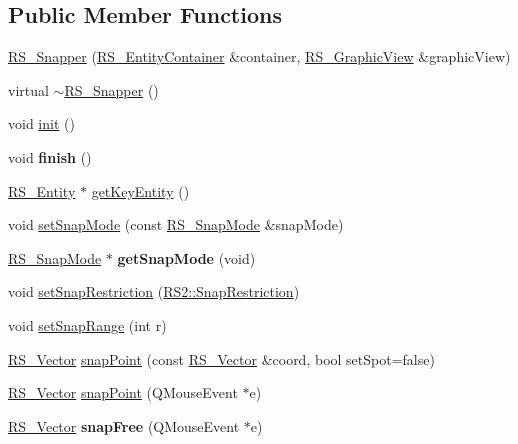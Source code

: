 \subsection*{Public Member Functions}
\begin{DoxyCompactItemize}
\item 
\hyperlink{classRS__Snapper_ac275c19d1cefc5a53a773a95d07f01af}{R\-S\-\_\-\-Snapper} (\hyperlink{classRS__EntityContainer}{R\-S\-\_\-\-Entity\-Container} \&container, \hyperlink{classRS__GraphicView}{R\-S\-\_\-\-Graphic\-View} \&graphic\-View)
\item 
virtual \hyperlink{classRS__Snapper_a307aee7fe748dcfcba6936aa525684be}{$\sim$\-R\-S\-\_\-\-Snapper} ()
\item 
void \hyperlink{classRS__Snapper_a2f21686760e5b1ae63aa2311fdf39373}{init} ()
\item 
\hypertarget{classRS__Snapper_a2f56cecc866af84a048eb78a4b08a8bd}{void {\bfseries finish} ()}\label{classRS__Snapper_a2f56cecc866af84a048eb78a4b08a8bd}

\item 
\hyperlink{classRS__Entity}{R\-S\-\_\-\-Entity} $\ast$ \hyperlink{classRS__Snapper_a37a59d9aebd2f28036edc37902f565d4}{get\-Key\-Entity} ()
\item 
void \hyperlink{classRS__Snapper_ac84e3f9dba31b693ed4af172a3cc7bc6}{set\-Snap\-Mode} (const \hyperlink{structRS__SnapMode}{R\-S\-\_\-\-Snap\-Mode} \&snap\-Mode)
\item 
\hypertarget{classRS__Snapper_ab896aecc9b25f3eef96e99ac8c7b2553}{\hyperlink{structRS__SnapMode}{R\-S\-\_\-\-Snap\-Mode} $\ast$ {\bfseries get\-Snap\-Mode} (void)}\label{classRS__Snapper_ab896aecc9b25f3eef96e99ac8c7b2553}

\item 
void \hyperlink{classRS__Snapper_a34d92e55d3853f3f8d1c1deb5b6258fb}{set\-Snap\-Restriction} (\hyperlink{classRS2_aac67b6890a08cff619c0fbef48377bae}{R\-S2\-::\-Snap\-Restriction})
\item 
void \hyperlink{classRS__Snapper_a313377258db3afd787a42b41f5954f54}{set\-Snap\-Range} (int r)
\item 
\hyperlink{classRS__Vector}{R\-S\-\_\-\-Vector} \hyperlink{classRS__Snapper_a40203d72bb7b1a1e23ea52bc0a55ce06}{snap\-Point} (const \hyperlink{classRS__Vector}{R\-S\-\_\-\-Vector} \&coord, bool set\-Spot=false)
\item 
\hyperlink{classRS__Vector}{R\-S\-\_\-\-Vector} \hyperlink{classRS__Snapper_a263c1a6420458b6cf04a124104655929}{snap\-Point} (Q\-Mouse\-Event $\ast$e)
\item 
\hypertarget{classRS__Snapper_ade6229d2bccdfe5343b9e2eba0980eef}{\hyperlink{classRS__Vector}{R\-S\-\_\-\-Vector} {\bfseries snap\-Free} (Q\-Mouse\-Event $\ast$e)}\label{classRS__Snapper_ade6229d2bccdfe5343b9e2eba0980eef}


\end{DoxyCompactItemize}
